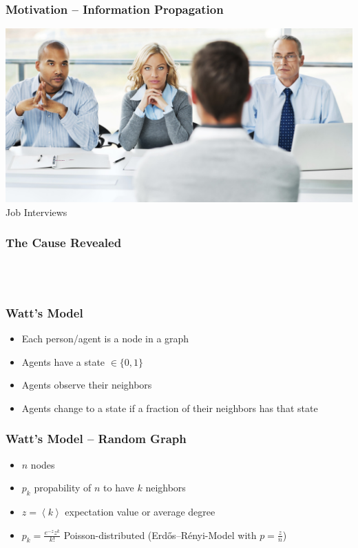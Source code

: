 \documentclass[slidestop,usenames,dvipsnames]{beamer}
\newcommand{\fitem}{\pause\vfill\item}
\begin{document}
\begin{frame}
    \frametitle{Motivation -- Information Propagation}
    \begin{center}
        \includegraphics[height=0.65\textheight]{img/totally-not-a-stockphoto}
        \vfill\vspace{8pt}
        {\huge Job Interviews}
    \end{center}
    \vfill
\end{frame}

\begin{frame}
    \frametitle{The Cause Revealed}
    \vfill
    \begin{center}
        \\
        \vspace{20pt}
        \\
        \vspace{20pt}
    \end{center}
    \vfill
\end{frame}

\begin{frame}
    \frametitle{Watt's Model}
    \begin{itemize}
        \fitem Each person/agent is a node in a graph
        \fitem Agents have a state $\in \lbrace 0, 1 \rbrace$
        \fitem Agents observe their neighbors
        \fitem Agents change to a state if a fraction of their neighbors has that state
    \end{itemize}
    \vfill
\end{frame}

\begin{frame}
  \frametitle{Watt's Model -- Random Graph}
  \begin{itemize}
    \fitem $n$ nodes
    \fitem $p_k$ propability of $n$ to have $k$ neighbors
    \fitem $z = \left<k\right>$ expectation value or average degree
    \fitem $p_k = \frac{e^{-z}z^k}{k!}$ Poisson-distributed (Erdős–Rényi-Model with $p = \frac{z}{n}$)
  \end{itemize}
  \vfill
\end{frame}
\end{document}
